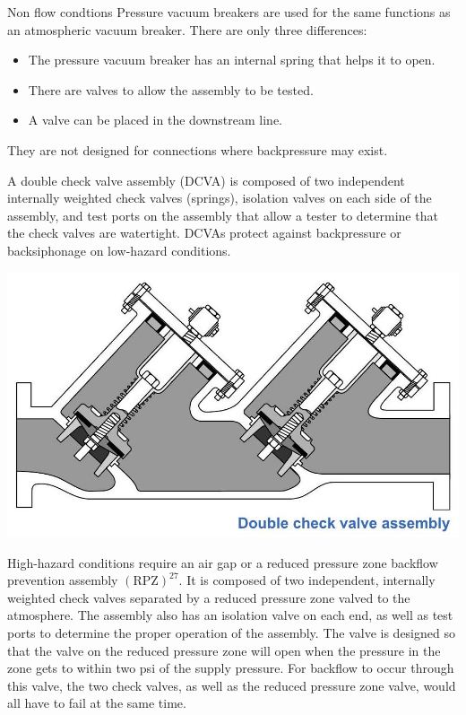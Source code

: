 \documentclass[10pt]{article}
\begin{document}
Non flow condtions Pressure vacuum breakers are used for the same functions as an atmospheric vacuum breaker. There are only three differences:

\begin{itemize}
  \item The pressure vacuum breaker has an internal spring that helps it to open.

  \item There are valves to allow the assembly to be tested.

  \item A valve can be placed in the downstream line.

\end{itemize}
They are not designed for connections where backpressure may exist.

A double check valve assembly (DCVA) is composed of two independent internally weighted check valves (springs), isolation valves on each side of the assembly, and test ports on the assembly that allow a tester to determine that the check valves are watertight. DCVAs protect against backpressure or backsiphonage on low-hazard conditions.

\includegraphics[max width=\textwidth]{DoubleCheckValveAssembly}

High-hazard conditions require an air gap or a reduced pressure zone backflow prevention assembly $(\mathrm{RPZ})^{27}$. It is composed of two independent, internally weighted check valves separated by a reduced pressure zone valved to the atmosphere. The assembly also has an isolation valve on each end, as well as test ports to determine the proper operation of the assembly. The valve is designed so that the valve on the reduced pressure zone will open when the pressure in the zone gets to within two psi of the supply pressure. For backflow to occur through this valve, the two check valves, as well as the reduced pressure zone valve, would all have to fail at the same time.
\end{document}
